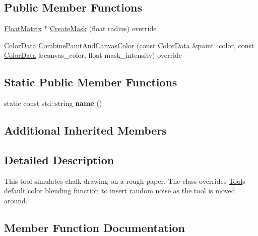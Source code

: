 \subsection*{Public Member Functions}
\begin{DoxyCompactItemize}
\item 
\hyperlink{classimage__tools_1_1FloatMatrix}{Float\+Matrix} $\ast$ \hyperlink{classimage__tools_1_1ToolChalk_ac5b2bd1d685a80ae4b296defcbc80580}{Create\+Mask} (float radius) override
\item 
\hyperlink{classimage__tools_1_1ColorData}{Color\+Data} \hyperlink{classimage__tools_1_1ToolChalk_ab2c6eda363c0fbc2283128eebbd817f5}{Combine\+Paint\+And\+Canvas\+Color} (const \hyperlink{classimage__tools_1_1ColorData}{Color\+Data} \&paint\+\_\+color, const \hyperlink{classimage__tools_1_1ColorData}{Color\+Data} \&canvas\+\_\+color, float mask\+\_\+intensity) override
\end{DoxyCompactItemize}
\subsection*{Static Public Member Functions}
\begin{DoxyCompactItemize}
\item 
\mbox{\label{classimage__tools_1_1ToolChalk_a8304555902b7708bab24821d355b3ff0}} 
static const std\+::string {\bfseries name} ()
\end{DoxyCompactItemize}
\subsection*{Additional Inherited Members}


\subsection{Detailed Description}
This tool simulates chalk drawing on a rough paper. The class overrides \hyperlink{classimage__tools_1_1Tool}{Tool}\textquotesingle{}s default color blending function to insert random noise as the tool is moved around. 

\subsection{Member Function Documentation}
\mbox{\label{classimage__tools_1_1ToolChalk_ab2c6eda363c0fbc2283128eebbd817f5}} 
